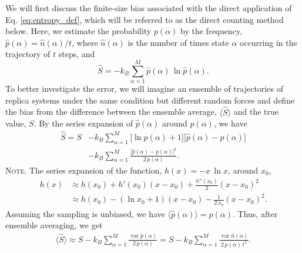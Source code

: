 \documentclass[preprint, superscriptaddress]{revtex4-1}
\newcommand{\note}[1]{{\color{DarkGreen}\footnotesize \textsc{Note.} #1}}
\begin{document}
We will first discuss the finite-size bias associated with
the direct application of Eq. \eqref{eq:entropy_def},
which will be referred to as the direct counting method below.
%
Here, we estimate the probability $p(\alpha)$
by the frequency, $\hat{p}(\alpha) = \hat{n}(\alpha) / t$,
where $\hat{n}(\alpha)$ is the number of times state $\alpha$ occurring in the trajectory of $t$ steps,
and
%
\begin{equation}
  \hat S
  =
  -k_B \sum_{\alpha = 1}^M \hat{p}(\alpha) \, \ln \hat{p}(\alpha)
  .
  \label{eq:entropy_est}
\end{equation}
%
To better investigate the error,
we will imagine an ensemble of trajectories of replica systems
under the same condition but different random forces
and define the bias from the difference
between the ensemble average,
$\langle \hat S \rangle$
and the true value, $S$.
%
By the series expansion of $\hat{p}(\alpha)$ around $p(\alpha)$, we have
%
\begin{align*}
  \hat S
  =
  S
  &- k_B \sum_{\alpha = 1}^M
    \bigl[\ln p(\alpha) + 1 \bigr]
    \bigl[ \hat{p}(\alpha) - p(\alpha) \bigr]
  \\
  &- k_B \sum_{\alpha = 1}^M
    \frac{ \bigl[ \hat{p}(\alpha) - p(\alpha) \bigr]^2 } { 2 \, p(\alpha) }
  .
\end{align*}
%
\note{The series expansion of the function, $h(x) = -x \, \ln x$,
around $x_0$,
%
\begin{align*}
  h(x)
  &\approx h(x_0) + h'(x_0) (x - x_0) + \frac{h''(x_0)}{2} (x - x_0)^2 \\
  &\approx h(x_0) - (\ln x_0 + 1) ( x - x_0) - \frac{1}{2 \, x_0} (x - x_0)^2
  .
\end{align*}
}
%
Assuming the sampling is unbiased,
we have $\langle \hat{p}(\alpha) \rangle = p(\alpha)$.
%
Thus, after ensemble averaging, we get
%
\begin{align*}
  \langle \hat S \rangle
  \approx
  S - k_B \sum_{\alpha = 1}^M
    \frac{ \operatorname{var} \hat{p}(\alpha) } { 2 \, p(\alpha) }
  =
  S - k_B \sum_{\alpha = 1}^M
    \frac{ \operatorname{var} \hat{n}(\alpha) } { 2 \, p(\alpha) \, t^2 }
  .
\end{align*}
\end{document}
